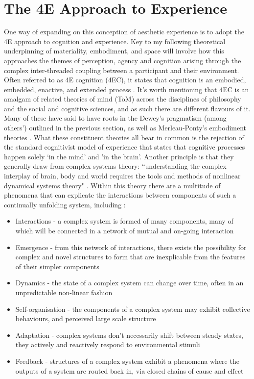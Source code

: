 \section{The 4E Approach to Experience}\label{sec: theory-4e}
One way of expanding on this conception of aesthetic experience is to adopt the 4E approach to cognition and experience. Key to my following theoretical underpinning of materiality, embodiment, and space will involve how this approaches the themes of perception, agency and cognition arising through the complex inter-threaded coupling between a participant and their environment. Often referred to as 4E cognition (4EC), it states that cognition is an embodied, embedded, enactive, and extended process \citep{gallagher2017}. It's worth mentioning that 4EC is an amalgam of related theories of mind (ToM) across the disciplines of philosophy and the social and cognitive sciences, and as such there are different flavours of it. Many of these have said to have roots in the Dewey's pragmatism (among others') outlined in the previous section, as well as Merleau-Ponty's embodiment theories \citep{zavota2016}. What these constituent theories all bear in common is the rejection of the standard cognitivist model of experience that states that cognitive processes happen solely `in the mind' and 'in the brain'. Another principle is that they generally draw from complex systems theory: ``understanding the complex interplay of brain, body and world requires the tools and methods of nonlinear dynamical systems theory" \citep{clark1999}. Within this theory there are a multitude of phenomena that can explicate the interactions between components of such a continually unfolding system, including \citep{dedomenico2019}:
\begin{itemize}
    \item Interactions - a complex system is formed of many components, many of which will be connected in a network of mutual and on-going interaction
    \item Emergence - from this network of interactions, there exists the possibility for complex and novel structures to form that are inexplicable from the features of their simpler components 
    \item Dynamics - the state of a complex system can change over time, often in an unpredictable non-linear fashion
    \item Self-organisation - the components of a complex system may exhibit collective behaviours, and perceived large scale structure
    \item Adaptation - complex systems don't necessarily shift between steady states, they actively and reactively respond to environmental stimuli
    \item Feedback - structures of a complex system exhibit a phenomena where the outputs of a system are routed back in, via closed chains of cause and effect 
\end{itemize}
